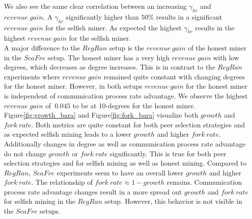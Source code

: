 We also see the same clear correlation between an increasing $\gamma_{hr}$ and $revenue~gain$. A $\gamma_{hr}$ significantly higher than $50\% $ results in a significant $revenue~gain$ for the selfish miner. As expected the highest $\gamma_{hr}$ results in the highest $revenue~gain$ for the selfish miner.\\
A major difference to the $RegRan$ setup is the $revenue~gain$ of the honest miner in the $ScaFre$ setup. The honest miner has a very high $revenue~gain$ with low degrees, which decreases as degree increases. This is in contrast to the $RegRan$ experiments where  $revenue~gain$ remained quite constant with changing degrees for the honest miner. However, in both setups $revenue~gain$ for the honest miner is independent of communication process rate advantage. We observe the highest $revenue~gain$ of $~0.045$ to be at 10-degrees for the honest miner.\\
Figure\ref{fig:growth_bara} and Figure\ref{fig:fork_bara} visualize both $growth$ and $fork~rate$. Both metrics are quite constant for both peer selection strategies and as expected selfish mining leads to a lower $growth$ and higher $fork~rate$. Additionally changes in degree as well as communication process rate advantage do not change $growth$ or $fork~rate$ significantly. This is true for both peer selection strategies and for selfish mining as well as honest mining. Compared to $RegRan$, $ScaFre$ experiments seem to have an overall lower $growth$ and higher $fork~rate$. The relationship of $fork~rate \approx 1-growth$ remains. Communication process rate advantage changes result in a more spread out $growth$ and $fork~rate$ for selfish mining in the $RegRan$ setup. However, this behavior is not visible in the $ScaFre$ setups.\\
